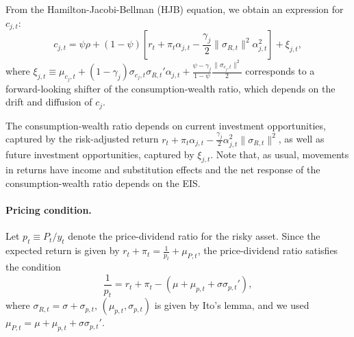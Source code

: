 From the Hamilton-Jacobi-Bellman (HJB) equation, we obtain an expression for $c_{j,t}$:
\begin{equation}\label{eq:xi_j}
    c_{j,t} = \psi \rho + (1-\psi) \left[ r_t + \pi_t \alpha_{j,t} - \frac{\gamma_j}{2} \|\sigma_{R,t}\|^2 \alpha_{j,t}^2\right] + \xi_{j,t},
\end{equation}
where $\xi_{j,t} \equiv \mu_{c_j,t} + (1-\gamma_j)  \sigma_{c_j,t} \sigma_{R,t}' \alpha_{j,t} + \frac{\psi - \gamma_j}{1-\psi} \frac{\|\sigma_{c_j,t}\|^2}{2}$ corresponds to a forward-looking shifter of the consumption-wealth ratio, which depends on the drift and diffusion of $c_j$.


The consumption-wealth ratio depends on current investment opportunities, captured by the risk-adjusted return $r_t + \pi_t \alpha_{j,t} - \frac{\gamma_j}{2} \alpha_{j,t}^2 \|\sigma_{R,t}\|^2$, as well as future investment opportunities, captured by $\xi_{j,t}$. Note that, as usual, movements in returns have income and substitution effects and the net response of the consumption-wealth ratio depends on the EIS.

\paragraph{Pricing condition.} Let $p_t \equiv P_t/y_t$ denote the price-dividend ratio for the risky asset. Since the expected return is given by $r_t + \pi_t = \frac{1}{p_t} + \mu_{P,t}$, the price-dividend ratio satisfies the condition
\begin{equation}\label{eq:pricing_cond}
    \frac{1}{p_t} = r_t + \pi_t  -(\mu + \mu_{p,t} + \sigma \sigma_{p,t}'),
\end{equation}
where $\sigma_{R,t} = \sigma + \sigma_{p,t}$, $(\mu_{p,t}, \sigma_{p,t})$ is given by Ito's lemma, and we used $\mu_{P,t} =\mu + \mu_{p,t} + \sigma \sigma_{p,t}' $. 


